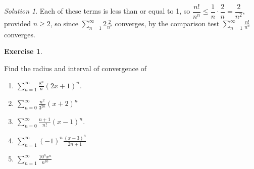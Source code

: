\documentclass[
]{book}
\providecommand{\tightlist}{%
  \setlength{\itemsep}{0pt}\setlength{\parskip}{0pt}}
\theoremstyle{definition}
\theoremstyle{definition}
\theoremstyle{definition}
\newtheorem{exercise}{Exercise}[chapter]
\theoremstyle{definition}
\theoremstyle{remark}
\newtheorem*{solution}{Solution}
\begin{document}
\begin{solution}
Each of these terms is less than or equal to 1, so \(\dfrac{n!}{n^n} \leq \dfrac{1}{n} \cdot \dfrac{2}{n} = \dfrac{2}{n^2}\), provided \(n \geq 2\), so since \(\displaystyle \sum_{n=1}^{\infty}{2} \frac{2}{n^2}\) converges, by the comparison test \(\displaystyle \sum_{n=1}^{\infty} \frac{n!}{n^n}\) converges.

\end{solution}

\begin{exercise}
\protect\hypertarget{exr:unlabeled-div-283}{}\label{exr:unlabeled-div-283}

Find the radius and interval of convergence of

\begin{enumerate}
\def\labelenumi{\arabic{enumi}.}
\tightlist
\item
  \(\displaystyle \sum_{n=1}^{\infty}\frac{8^n}{n}(2x+1)^n\).
\item
  \(\displaystyle \sum_{n=0}^{\infty}\frac{n^2}{3^{2n}}(x+2)^n\)
\item
  \(\displaystyle \sum_{n=0}^{\infty}\frac{n+1}{n!}(x-1)^n\).
\item
  \(\displaystyle\sum_{n=1}^\infty (-1)^n \frac{(x-3)^n}{2n+1}\)
\item
  \(\displaystyle \sum_{n=1}^\infty \frac{10^n x^n}{n^{10}}\)
\end{enumerate}

\end{exercise}
\end{document}
